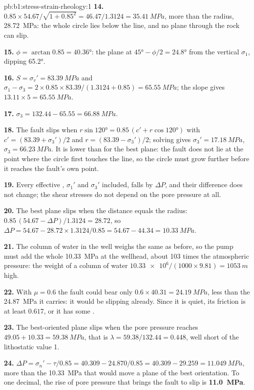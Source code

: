 \begin{solution}{pb:b1:stress-strain-rheology:1}
\textbf{14.} $0.85\times54.67/\sqrt{1 + 0.85^2} = 46.47/1.3124 =
\qty{35.41}{MPa}$, more than the radius, \qty{28.72}{MPa}: the whole circle
lies below the line, and no plane through the rock can slip.

\textbf{15.} $\phi = \arctan0.85 = \ang{40.36}$: the plane at
$\ang{45} - \phi/2 = \ang{24.8}$ from the vertical $\sigma_1$, dipping
\ang{65.2}.

\textbf{16.} $S = \sigma_v' = \qty{83.39}{MPa}$ and
$\sigma_1 - \sigma_3 = 2\times0.85\times83.39/(1.3124 + 0.85) =
\qty{65.55}{MPa}$; the slope gives $13.11\times5 = \qty{65.55}{MPa}$.

\textbf{17.} $\sigma_3 = 132.44 - 65.55 = \qty{66.88}{MPa}$.

\textbf{18.} The fault slips when
$r\sin\ang{120} = 0.85\,(c' + r\cos\ang{120})$ with
$c' = (83.39 + \sigma_3')/2$ and $r = (83.39 - \sigma_3')/2$; solving gives
$\sigma_3' = \qty{17.18}{MPa}$, $\sigma_3 = \qty{66.23}{MPa}$. It is lower
than for the best plane: the fault does not lie at the point where the circle
first touches the line, so the circle must grow further before it reaches
the fault's own point.

\textbf{19.} Every effective , $\sigma_1'$ and $\sigma_3'$
included, falls by $\Delta P$, and their difference does not change; the
shear stresses do not depend on the pore pressure at all.

\textbf{20.} The best plane slips when the distance equals the radius:
$0.85\,(54.67 - \Delta P)/1.3124 = 28.72$, so
$\Delta P = 54.67 - 28.72\times1.3124/0.85 = 54.67 - 44.34 = \qty{10.33}{MPa}$.

\textbf{21.} The column of water in the well weighs the same as before, so the
pump must add the whole \qty{10.33}{MPa} at the wellhead, about 103 times
the atmospheric pressure: the weight of a column of water
$\num{10.33e6}/(1000\times9.81) = \qty{1053}{m}$ high.

\textbf{22.} With $\mu = 0.6$ the fault could bear only
$0.6\times40.31 = \qty{24.19}{MPa}$, less than the \qty{24.87}{MPa} it
carries: it would be slipping already. Since it is quiet, its friction is at
least $0.617$, or it has some .

\textbf{23.} The best-oriented plane slips when the pore pressure reaches
$49.05 + 10.33 = \qty{59.38}{MPa}$, that is $\lambda = 59.38/132.44 = 0.448$,
well short of the lithostatic value 1.

\textbf{24.} $\Delta P = \sigma_n' - \tau/0.85 = 40.309 - 24.870/0.85 = 40.309 -
29.259 = \qty{11.049}{MPa}$, more than the \qty{10.33}{MPa} that would move a
plane of the best orientation. To one decimal, the rise of pore pressure that
brings the fault to slip is
\textbf{\qty[text-series-to-math=true]{11.0}{MPa}}.
\end{solution}

